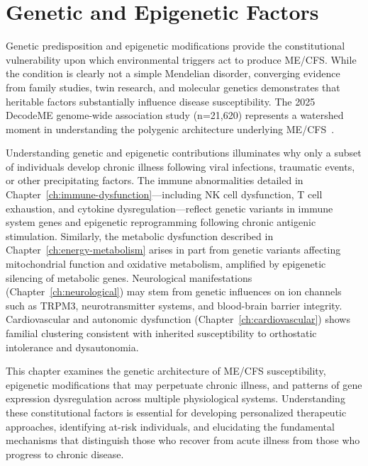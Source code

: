\chapter{Genetic and Epigenetic Factors}
\label{ch:genetics-epigenetics}

Genetic predisposition and epigenetic modifications provide the constitutional vulnerability upon which environmental triggers act to produce ME/CFS. While the condition is clearly not a simple Mendelian disorder, converging evidence from family studies, twin research, and molecular genetics demonstrates that heritable factors substantially influence disease susceptibility. The 2025 DecodeME genome-wide association study (n=21,620) represents a watershed moment in understanding the polygenic architecture underlying ME/CFS~\cite{DecodeME2025}.

Understanding genetic and epigenetic contributions illuminates why only a subset of individuals develop chronic illness following viral infections, traumatic events, or other precipitating factors. The immune abnormalities detailed in Chapter~\ref{ch:immune-dysfunction}---including NK cell dysfunction, T cell exhaustion, and cytokine dysregulation---reflect genetic variants in immune system genes and epigenetic reprogramming following chronic antigenic stimulation. Similarly, the metabolic dysfunction described in Chapter~\ref{ch:energy-metabolism} arises in part from genetic variants affecting mitochondrial function and oxidative metabolism, amplified by epigenetic silencing of metabolic genes. Neurological manifestations (Chapter~\ref{ch:neurological}) may stem from genetic influences on ion channels such as TRPM3, neurotransmitter systems, and blood-brain barrier integrity. Cardiovascular and autonomic dysfunction (Chapter~\ref{ch:cardiovascular}) shows familial clustering consistent with inherited susceptibility to orthostatic intolerance and dysautonomia.

This chapter examines the genetic architecture of ME/CFS susceptibility, epigenetic modifications that may perpetuate chronic illness, and patterns of gene expression dysregulation across multiple physiological systems. Understanding these constitutional factors is essential for developing personalized therapeutic approaches, identifying at-risk individuals, and elucidating the fundamental mechanisms that distinguish those who recover from acute illness from those who progress to chronic disease.

